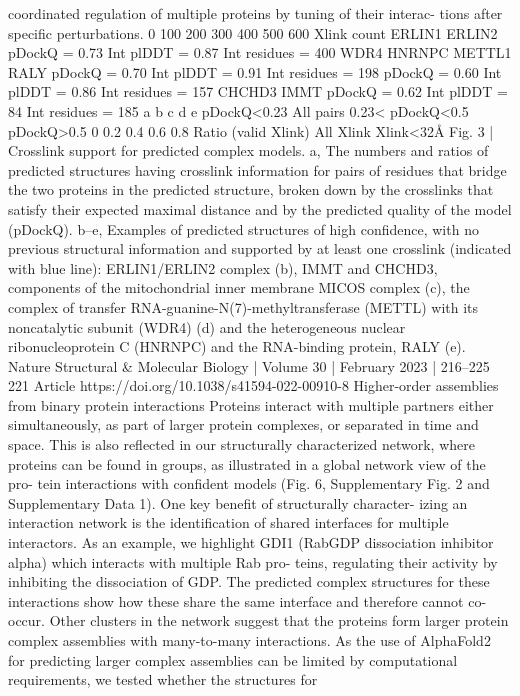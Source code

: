 coordinated regulation of multiple proteins by tuning of their interac-
tions after specific perturbations.
0
100 200 300 400 500 600
Xlink count
ERLIN1
ERLIN2
pDockQ = 0.73
Int plDDT = 0.87
Int residues = 400
WDR4
HNRNPC
METTL1
RALY
pDockQ = 0.70
Int plDDT = 0.91
Int residues = 198
pDockQ = 0.60
Int plDDT = 0.86
Int residues = 157
CHCHD3
IMMT
pDockQ = 0.62
Int plDDT = 84
Int residues = 185
a
b
c
d
e
pDockQ<0.23
All pairs
0.23<
pDockQ<0.5
pDockQ>0.5
0
0.2 0.4 0.6 0.8
Ratio (valid Xlink)
All Xlink
Xlink<32Å
Fig. 3 | Crosslink support for predicted complex models. a, The numbers and
ratios of predicted structures having crosslink information for pairs of residues
that bridge the two proteins in the predicted structure, broken down by the
crosslinks that satisfy their expected maximal distance and by the predicted
quality of the model (pDockQ). b–e, Examples of predicted structures of high
confidence, with no previous structural information and supported by at least
one crosslink (indicated with blue line): ERLIN1/ERLIN2 complex (b), IMMT and
CHCHD3, components of the mitochondrial inner membrane MICOS complex
(c), the complex of transfer RNA-guanine-N(7)-methyltransferase (METTL)
with its noncatalytic subunit (WDR4) (d) and the heterogeneous nuclear
ribonucleoprotein C (HNRNPC) and the RNA-binding protein, RALY (e).
Nature Structural \& Molecular Biology | Volume 30 | February 2023 | 216–225
221
Article
https://doi.org/10.1038/s41594-022-00910-8
Higher-order assemblies from binary protein
interactions
Proteins interact with multiple partners either simultaneously, as part
of larger protein complexes, or separated in time and space. This is also
reflected in our structurally characterized network, where proteins can
be found in groups, as illustrated in a global network view of the pro-
tein interactions with confident models (Fig. 6, Supplementary Fig. 2
and Supplementary Data 1). One key benefit of structurally character-
izing an interaction network is the identification of shared interfaces
for multiple interactors. As an example, we highlight GDI1 (RabGDP
dissociation inhibitor alpha) which interacts with multiple Rab pro-
teins, regulating their activity by inhibiting the dissociation of GDP.
The predicted complex structures for these interactions show how
these share the same interface and therefore cannot co-occur. Other
clusters in the network suggest that the proteins form larger protein
complex assemblies with many-to-many interactions. As the use of
AlphaFold2 for predicting larger complex assemblies can be limited
by computational requirements, we tested whether the structures for
